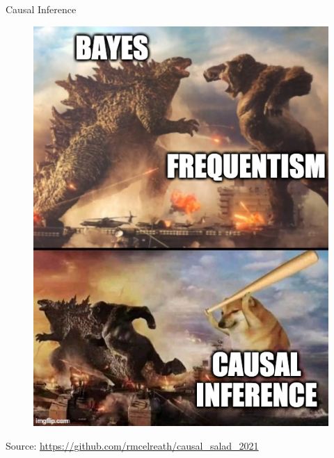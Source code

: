 \documentclass[handout]{beamer}
\begin{document}
\begin{frame}{Causal Inference}


\begin{figure}[h!]
	\centering
	\includegraphics[scale=0.28]{pics/causalMeme.jpeg}
	\end{figure} 

	\footnotesize
	Source: \url{https://github.com/rmcelreath/causal_salad_2021}


\end{frame}
\end{document}
